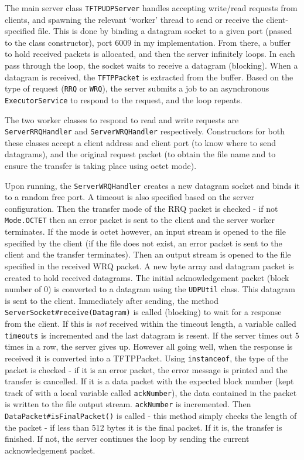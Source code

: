 \documentclass[a4paper]{article}
\newcommand{\code}{\texttt}
\begin{document}
The main server class \code{TFTPUDPServer} handles accepting write/read requests from clients, and spawning the relevant `worker' thread to send or receive the client-specified file. This is done by binding a datagram socket to a given port (passed to the class constructor), port 6009 in my implementation. From there, a buffer to hold received packets is allocated, and then the server infinitely loops. In each pass through the loop, the socket waits to receive a datagram (blocking). When a datagram is received, the \code{TFTPPacket} is extracted from the buffer. Based on the type of request (\code{RRQ} or \code{WRQ}), the server submits a job to an asynchronous \code{ExecutorService} to respond to the request, and the loop repeats.

The two worker classes to respond to read and write requests are \code{ServerRRQHandler} and \code{ServerWRQHandler} respectively. Constructors for both these classes accept a client address and client port (to know where to send datagrams), and the original request packet (to obtain the file name and to ensure the transfer is taking place using octet mode).

Upon running, the \code{ServerWRQHandler} creates a new datagram socket and binds it to a random free port.  A timeout is also specified based on the server configuration. Then the transfer mode of the RRQ packet is checked - if not \code{Mode.OCTET} then an error packet is sent to the client and the server worker terminates. If the mode is octet however, an input stream is opened to the file specified by the client (if the file does not exist, an error packet is sent to the client and the transfer terminates). Then an output stream is opened to the file specified in the received WRQ packet. A new byte array and datagram packet is created to hold received datagrams. The initial acknowledgement packet (block number of 0) is converted to a datagram using the \code{UDPUtil} class. This datagram is sent to the client. Immediately after sending, the method \code{ServerSocket\#receive(Datagram)} is called (blocking) to wait for a response from the client. If this is \textit{not} received within the timeout length, a variable called \code{timeouts} is incremented and the last datagram is resent. If the server times out 5 times in a row, the server gives up. However all going well, when the response is received it is converted into a TFTPPacket. Using \code{instanceof}, the type of the packet is checked - if it is an error packet, the error message is printed and the transfer is cancelled. If it is a data packet with the expected block number (kept track of with a local variable called \code{ackNumber}), the data contained in the packet is written to the file output stream. \code{ackNumber} is incremented. Then \code{DataPacket\#isFinalPacket()} is called - this method simply checks the length of the packet - if less than 512 bytes it is the final packet. If it is, the transfer is finished. If not, the server continues the loop by sending the current acknowledgement packet.
\end{document}
